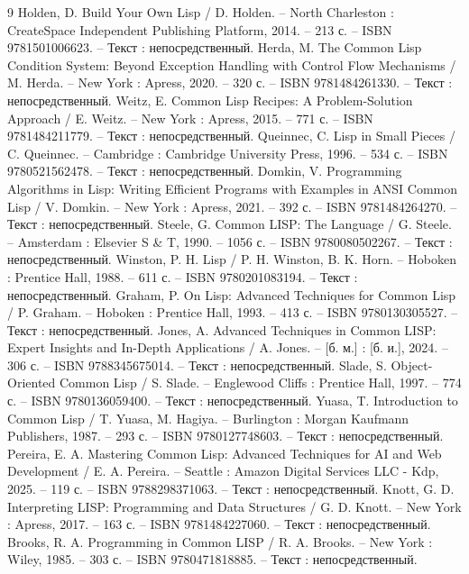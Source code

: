 \begin{thebibliography}{9}
    Holden, D. Build Your Own Lisp / D. Holden. -- North Charleston : CreateSpace Independent Publishing Platform, 2014. -- 213 с. -- ISBN 9781501006623. -- Текст : непосредственный.
    Herda, M. The Common Lisp Condition System: Beyond Exception Handling with Control Flow Mechanisms / M. Herda. -- New York : Apress, 2020. -- 320 с. -- ISBN 9781484261330. -- Текст : непосредственный.
    Weitz, E. Common Lisp Recipes: A Problem-Solution Approach / E. Weitz. -- New York : Apress, 2015. -- 771 с. -- ISBN 9781484211779. -- Текст : непосредственный.
    Queinnec, C. Lisp in Small Pieces / C. Queinnec. -- Cambridge : Cambridge University Press, 1996. -- 534 с. -- ISBN 9780521562478. -- Текст : непосредственный.
    Domkin, V. Programming Algorithms in Lisp: Writing Efficient Programs with Examples in ANSI Common Lisp / V. Domkin. -- New York : Apress, 2021. -- 392 с. -- ISBN 9781484264270. -- Текст : непосредственный.
    Steele, G. Common LISP: The Language / G. Steele. -- Amsterdam : Elsevier S \& T, 1990. -- 1056 с. -- ISBN 9780080502267. -- Текст : непосредственный.
    Winston, P. H. Lisp / P. H. Winston, B. K. Horn. -- Hoboken : Prentice Hall, 1988. -- 611 с. -- ISBN 9780201083194. -- Текст : непосредственный.
    Graham, P. On Lisp: Advanced Techniques for Common Lisp / P. Graham. -- Hoboken : Prentice Hall, 1993. -- 413 с. -- ISBN 9780130305527. -- Текст : непосредственный.
    Jones, A. Advanced Techniques in Common LISP: Expert Insights and In-Depth Applications / A. Jones. -- [б. м.] : [б. и.], 2024. -- 306 с. -- ISBN 9788345675014. -- Текст : непосредственный.
    Slade, S. Object-Oriented Common Lisp / S. Slade. -- Englewood Cliffs : Prentice Hall, 1997. -- 774 с. -- ISBN 9780136059400. -- Текст : непосредственный.
    Yuasa, T. Introduction to Common Lisp / T. Yuasa, M. Hagiya. -- Burlington : Morgan Kaufmann Publishers, 1987. -- 293 с. -- ISBN 9780127748603. -- Текст : непосредственный.
    Pereira, E. A. Mastering Common Lisp: Advanced Techniques for AI and Web Development / E. A. Pereira. -- Seattle : Amazon Digital Services LLC - Kdp, 2025. -- 119 с. -- ISBN 9788298371063. -- Текст : непосредственный.
    Knott, G. D. Interpreting LISP: Programming and Data Structures / G. D. Knott. -- New York : Apress, 2017. -- 163 с. -- ISBN 9781484227060. -- Текст : непосредственный.
    Brooks, R. A. Programming in Common LISP / R. A. Brooks. -- New York : Wiley, 1985. -- 303 с. -- ISBN 9780471818885. -- Текст : непосредственный.

\end{thebibliography}

